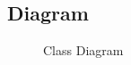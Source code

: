 \documentclass[a4paper]{article}
\begin{document}
\subsection{Diagram}
\begin{figure}[!ht]
    \centering
    \caption{Class Diagram}
    \label{fig:class}
\end{figure}
\end{document}
